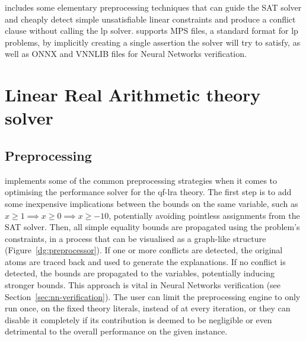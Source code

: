 \documentclass[runningheads]{llncs}
\begin{document}
\dlinear includes some elementary preprocessing techniques that can guide the SAT solver and cheaply detect simple unsatisfiable linear constraints and produce a conflict clause without calling the \gls{lp} solver.
\dlinear supports MPS files, a standard format for \gls{lp} problems, by implicitly creating a single assertion the solver will try to satisfy, as well as ONNX and VNNLIB files for Neural Networks verification.

\section{Linear Real Arithmetic theory solver}
\label{sec:lra-theory-solver}

\subsection*{Preprocessing}
\label{sec:preprocessing}

\dlinear implements some of the common preprocessing strategies when it comes to optimising the performance solver for the \gls{qf-lra} theory.
The first step is to add some inexpensive implications between the bounds on the same variable, such as $x \ge 1 \implies x \ge 0 \implies x \ge -10$, potentially avoiding pointless assignments from the SAT solver.
Then, all simple equality bounds are propagated using the problem's constraints, in a process that can be visualised as a graph-like structure (Figure~\ref{dg:preprocessor}).
If one or more conflicts are detected, the original atoms are traced back and used to generate the explanations.
If no conflict is detected, the bounds are propagated to the variables, potentially inducing stronger bounds.
This approach is vital in Neural Networks verification (see Section~\ref{sec:nn-verification}).
The user can limit the preprocessing engine to only run once, on the fixed theory literals, instead of at every iteration, or they can disable it completely if its contribution is deemed to be negligible or even detrimental to the overall performance on the given instance.
\end{document}

